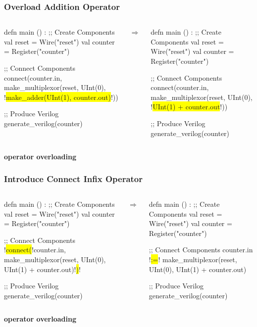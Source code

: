 \documentclass[xcolor=pdflatex,dvipsnames,table]{beamer}
\begin{document}
\begin{frame}[fragile]
\frametitle{Overload Addition Operator}
\begin{columns}
{
\begin{stanza}
defn main () :
  ;; Create Components
  val reset   = Wire("reset")
  val counter = Register("counter")

  ;; Connect Components
  connect(counter.in, 
    make_multiplexor(reset,
      UInt(0),
      !\colorbox{yellow}{make\_adder(UInt(1), counter.out)}!))

  ;; Produce Verilog
  generate_verilog(counter)
\end{stanza}
}
\begin{center}
$\Rightarrow$
\end{center}
{
\begin{stanza}
defn main () :
  ;; Create Components
  val reset   = Wire("reset")
  val counter = Register("counter")

  ;; Connect Components
  connect(counter.in, 
    make_multiplexor(reset,
      UInt(0),
      !\colorbox{yellow}{UInt(1) + counter.out}!))

  ;; Produce Verilog
  generate_verilog(counter)
\end{stanza}
}
\end{columns}
\vspace{1cm}
{\bf operator overloading}
\end{frame}

\begin{frame}[fragile]
\frametitle{Introduce Connect Infix Operator}
\begin{columns}
{
\begin{stanza}
defn main () :
  ;; Create Components
  val reset   = Wire("reset")
  val counter = Register("counter")

  ;; Connect Components
  !\colorbox{yellow}{connect(}!counter.in, 
    make_multiplexor(reset,
      UInt(0),
      UInt(1) + counter.out)!\colorbox{yellow}{)}!

  ;; Produce Verilog
  generate_verilog(counter)
\end{stanza}
}
\begin{center}
$\Rightarrow$
\end{center}
{
\begin{stanza}
defn main () :
  ;; Create Components
  val reset   = Wire("reset")
  val counter = Register("counter")

  ;; Connect Components
  counter.in !\colorbox{yellow}{:=}!
    make_multiplexor(reset,
      UInt(0),
      UInt(1) + counter.out)

  ;; Produce Verilog
  generate_verilog(counter)
\end{stanza}
}
\end{columns}
\vspace{1cm}
{\bf operator overloading}
\end{frame}
\end{document}
